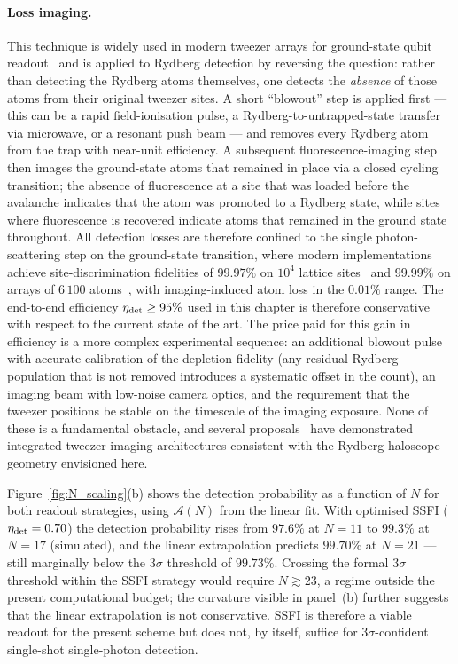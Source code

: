 \paragraph{Loss imaging.}
This technique is widely used in modern tweezer arrays for ground-state qubit readout~\cite{Endres2016, Bluvstein2024} and is applied to Rydberg detection by reversing the question: rather than detecting the Rydberg atoms themselves, one detects the \emph{absence} of those atoms from their original tweezer sites. A short ``blowout'' step is applied first --- this can be a rapid field-ionisation pulse, a Rydberg-to-untrapped-state transfer via microwave, or a resonant push beam --- and removes every Rydberg atom from the trap with near-unit efficiency. A subsequent fluorescence-imaging step then images the ground-state atoms that remained in place via a closed cycling transition; the absence of fluorescence at a site that was loaded before the avalanche indicates that the atom was promoted to a Rydberg state, while sites where fluorescence is recovered indicate atoms that remained in the ground state throughout. All detection losses are therefore confined to the single photon-scattering step on the ground-state transition, where modern implementations achieve site-discrimination fidelities of $99.97\%$ on $10^4$ lattice sites~\cite{Tao2024} and $99.99\%$ on arrays of $6\,100$ atoms~\cite{Manetsch2025}, with imaging-induced atom loss in the $0.01\%$ range. The end-to-end efficiency $\eta_{\rm det} \geq 95\%$ used in this chapter is therefore conservative with respect to the current state of the art. The price paid for this gain in efficiency is a more complex experimental sequence: an additional blowout pulse with accurate calibration of the depletion fidelity (any residual Rydberg population that is not removed introduces a systematic offset in the count), an imaging beam with low-noise camera optics, and the requirement that the tweezer positions be stable on the timescale of the imaging exposure. None of these is a fundamental obstacle, and several proposals~\cite{Bluvstein2024, Manetsch2025} have demonstrated integrated tweezer-imaging architectures consistent with the Rydberg-haloscope geometry envisioned here.

Figure~\ref{fig:N_scaling}(b) shows the detection probability as a function of $N$ for both readout strategies, using $\mathcal{A}(N)$ from the linear fit. With optimised SSFI ($\eta_{\rm det} = 0.70$) the detection probability rises from $97.6\%$ at $N=11$ to $99.3\%$ at $N=17$ (simulated), and the linear extrapolation predicts $99.70\%$ at $N=21$ --- still marginally below the $3\sigma$ threshold of $99.73\%$. Crossing the formal $3\sigma$ threshold within the SSFI strategy would require $N \gtrsim 23$, a regime outside the present computational budget; the curvature visible in panel~(b) further suggests that the linear extrapolation is not conservative. SSFI is therefore a viable readout for the present scheme but does not, by itself, suffice for $3\sigma$-confident single-shot single-photon detection.

